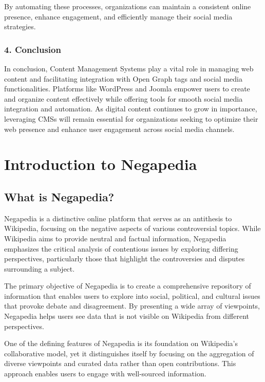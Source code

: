 By automating these processes, organizations can maintain a consistent online presence, enhance engagement, and efficiently manage their social media strategies.

\subsubsection{4. Conclusion}

In conclusion, Content Management Systems play a vital role in managing web content and facilitating integration with Open Graph tags and social media functionalities. Platforms like WordPress and Joomla empower users to create and organize content effectively while offering tools for smooth social media integration and automation. As digital content continues to grow in importance, leveraging CMSs will remain essential for organizations seeking to optimize their web presence and enhance user engagement across social media channels.


\section{Introduction to Negapedia}
\label{sec:introduction_to_negapedia}

\subsection{What is Negapedia?}
\label{subsec:what_is_negapedia}

Negapedia is a distinctive online platform that serves as an antithesis to Wikipedia, focusing on the negative aspects of various controversial topics. While Wikipedia aims to provide neutral and factual information, Negapedia emphasizes the critical analysis of contentious issues by exploring differing perspectives, particularly those that highlight the controversies and disputes surrounding a subject.

The primary objective of Negapedia is to create a comprehensive repository of information that enables users to explore into social, political, and cultural issues that provoke debate and disagreement. By presenting a wide array of viewpoints, Negapedia helps users see data that is not visible on Wikipedia from different perspectives.

One of the defining features of Negapedia is its foundation on Wikipedia's collaborative model, yet it distinguishes itself by focusing on the aggregation of diverse viewpoints and curated data rather than open contributions. This approach enables users to engage with well-sourced information.

